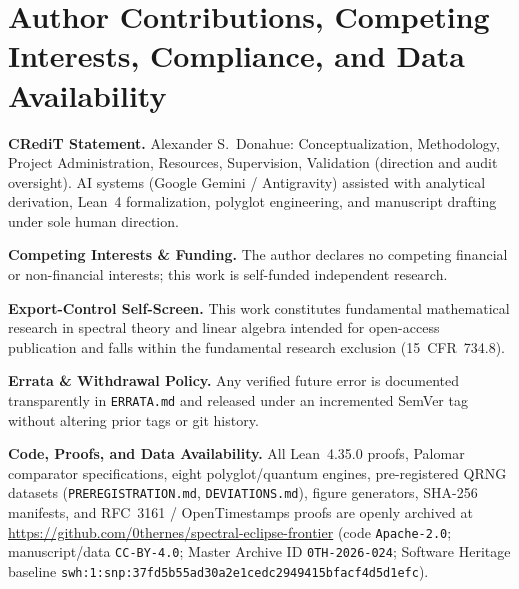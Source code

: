 \documentclass[11pt,reqno]{amsart}
\theoremstyle{definition}
\newcommand{\id}[1]{\textnormal{\texttt{\small #1}}}
\begin{document}
\section*{Author Contributions, Competing Interests, Compliance, and Data Availability}

\textbf{CRediT Statement.} Alexander S.~Donahue: Conceptualization, Methodology, Project Administration, Resources, Supervision, Validation (direction and audit oversight). AI systems (Google Gemini / Antigravity) assisted with analytical derivation, Lean~4 formalization, polyglot engineering, and manuscript drafting under sole human direction.

\textbf{Competing Interests \& Funding.} The author declares no competing financial or non-financial interests; this work is self-funded independent research.

\textbf{Export-Control Self-Screen.} This work constitutes fundamental mathematical research in spectral theory and linear algebra intended for open-access publication and falls within the fundamental research exclusion (15~CFR~734.8).

\textbf{Errata \& Withdrawal Policy.} Any verified future error is documented transparently in \id{ERRATA.md} and released under an incremented SemVer tag without altering prior tags or git history.

\textbf{Code, Proofs, and Data Availability.} All Lean~4.35.0 proofs, Palomar comparator specifications, eight polyglot/quantum engines, pre-registered QRNG datasets (\id{PREREGISTRATION.md}, \id{DEVIATIONS.md}), figure generators, SHA-256 manifests, and RFC~3161 / OpenTimestamps proofs are openly archived at \url{https://github.com/0thernes/spectral-eclipse-frontier} (code \texttt{Apache-2.0}; manuscript/data \texttt{CC-BY-4.0}; Master Archive ID \id{0TH-2026-024}; Software Heritage baseline \nolinkurl{swh:1:snp:37fd5b55ad30a2e1cedc2949415bfacf4d5d1efc}).



\end{document}
